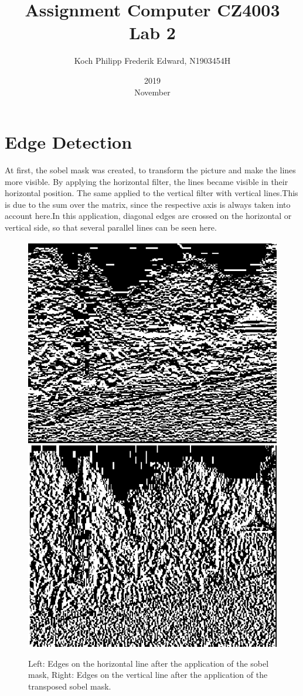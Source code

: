 \documentclass{article}
\title{Assignment Computer CZ4003 \\ Lab 2}
\date{2019 \\ November}
\author{Koch Philipp Frederik Edward, N1903454H}
\begin{document}
	
	\maketitle
	
	\section{Edge Detection}

	At first, the sobel mask was created, to transform the picture and make the lines more visible.
	By applying the horizontal filter, the lines became visible in their horizontal position.
	The same applied to the vertical filter with vertical lines.This is due to the sum over the matrix, 
	since the respective axis is always taken into account here.In this application, 
	diagonal edges are crossed on the horizontal or vertical side, so that several parallel lines can be seen here.
	\begin{figure}[!h]
		\center
		\caption{Left: Edges on the horizontal line after the application of the sobel mask, Right: Edges on the vertical line after the application of the transposed sobel mask.}
		\includegraphics[scale=0.5]{I_outx.png}
		\includegraphics[scale=0.5]{I_outy.png}
		
	\end{figure}
\end{document}
